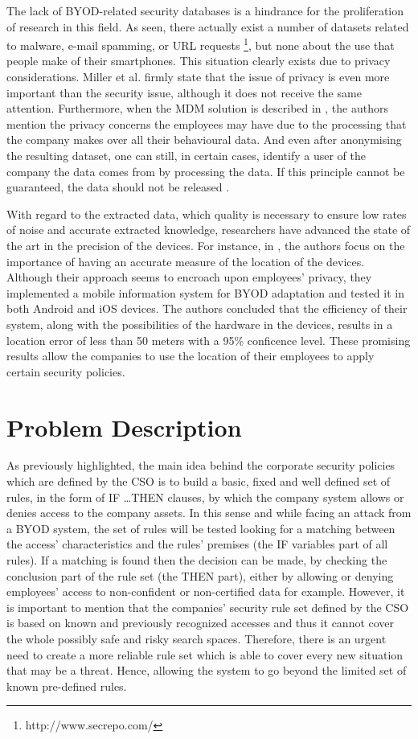 \documentclass[a4paper,10pt,twocolumn,preprint,3p]{elsarticle}
\begin{document}
The lack of BYOD-related security databases is a hindrance for the proliferation of research in this field. As seen, there actually exist a number of datasets related to malware, e-mail spamming, or URL requests \footnote{http://www.secrepo.com/}, but none about the use that people make of their smartphones. This situation clearly exists due to privacy considerations. Miller et al. \cite{Miller201253} firmly state that the issue of privacy is even more important than the security issue, although it does not receive the same attention. Furthermore, when the MDM solution is described in \cite{ali2015analysis}, the authors mention the privacy concerns the employees may have due to the processing that the company makes over all their behavioural data. And even after anonymising the resulting dataset, one can still, in certain cases, identify a user of the company the data comes from by processing the data. If this principle cannot be guaranteed, the data should not be released \cite{boillat2014handbook}.

With regard to the extracted data, which quality is necessary to ensure low rates of noise and accurate extracted knowledge, researchers have advanced the state of the art in the precision of the devices. For instance, in \cite{rios2015mobile}, the authors focus on the importance of having an accurate measure of the location of the devices. Although their approach seems to encroach upon employees' privacy, they implemented a mobile information system for BYOD adaptation and tested it in both Android and iOS devices. The authors concluded that the efficiency of their system, along with the possibilities of the hardware in the devices, results in a location error of less than 50 meters with a 95\% conficence level. These promising results allow the companies to use the location of their employees to apply certain security policies. 

\section{Problem Description}
\label{sec:problem}

As previously highlighted, the main idea behind the corporate security policies which are defined by the CSO is to build a basic, fixed and well defined set of rules, in the form of \textsc{IF \ldots THEN} clauses,  by which the company system allows or denies access to the company assets. In this sense and while facing an attack from a BYOD system, the set of rules will be tested looking for a matching between the access' characteristics and the rules' premises (the IF variables part of all rules). If a matching is found then the decision can be made, by checking the conclusion part of the rule set (the THEN part), either by allowing or denying employees' access to non-confident or non-certified data for example. However, it is important to mention that the companies' security rule set defined by the CSO is based on known and previously recognized accesses and thus it cannot cover the whole possibly safe and risky search spaces. Therefore, there is an urgent need to create a more reliable rule set which is able to cover every new situation that may be a threat. Hence, allowing the system to go beyond the limited set of known pre-defined rules.
\end{document}
